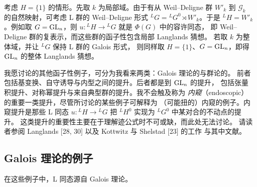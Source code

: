 考虑 $H=\{1\}$ 的情形。先取 $k$ 为局部域。由于有从 Weil--Deligne 群
$W'_k$ 到 $\mathcal{G}_k$ 的自然映射，可考虑 L 群的 Weil--Deligne 形式
${}^{L}G={}^{L}G^{0}\rtimes W'_k$。于是 ${}^{L}H=W'_k$。例如取
$G=\mathrm{GL}_n$，则 $u\colon{}^{L}H\to{}^{L}G$ 就是 $\Phi(G)$ 中的容许同态，
即 Weil--Deligne 群的复表示，而这些群的函子性包含局部 Langlands 猜想。
若取 $k$ 为整体域，并让 ${}^{L}G$ 保持 L 群的 Galois 形式，
则同样取 $H=\{1\}$、$G=\mathrm{GL}_n$，即得 $\mathrm{GL}_n$ 的整体 Langlands 猜想。

我愿讨论的其他函子性例子，可分为我看来两类：Galois 理论的与群论的。
前者包括基变换、自守诱导与内型之间的提升。后者都是到 $\mathrm{GL}_n$ 的提升，
包括张量积提升、对称幂提升与来自典型群的提升。我不会触及称为
\emph{内窥}（endoscopic）的重要一类提升，尽管所讨论的某些例子可解释为
（可能扭的）内窥的例子。内窥提升是那些 L 同态 $u\colon{}^{L}H\to{}^{L}G$
把 ${}^{L}H^{0}$ 实现为 ${}^{L}G^{0}$ 中某对合的不动点的提升。
这类提升的重要性主要在于理解迹公式时不可或缺，而此处无法讨论。
请读者参阅 Langlands [28, 30] 以及 Kottwitz 与 Shelstad [23] 的工作
与其中文献。

\subsection{Galois 理论的例子}

在这些例子中，L 同态源自 Galois 理论。

